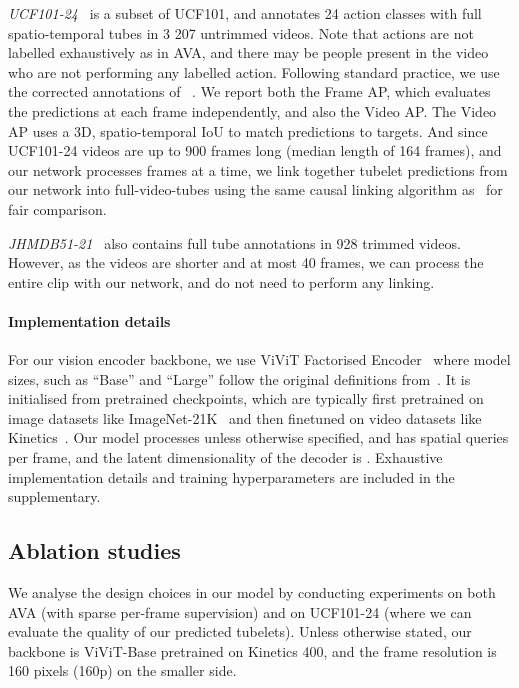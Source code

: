 \documentclass[10pt,twocolumn,letterpaper]{article}
\def \paravspace {-0.7\baselineskip}
\begin{document}
\textit{UCF101-24~\cite{soomro_arxiv_2012}} is a subset of UCF101, and annotates 24 action classes 
with full spatio-temporal tubes in 3 207 untrimmed videos.
Note that actions are not labelled exhaustively as in AVA, and there may be people present in the video who are not performing any labelled action.
Following standard practice, we use the corrected annotations of ~\cite{singh_iccv_2017}.
We report both the Frame AP, which evaluates the predictions at each frame independently, and also the Video AP.
The Video AP uses a 3D, spatio-temporal IoU to match predictions to targets.
And since UCF101-24 videos are up to 900 frames long (median length of 164 frames), and our network processes  frames at a time, we link together tubelet predictions from our network into full-video-tubes using the same causal linking algorithm as~\cite{kalogeiton_iccv_2017, li2020actions} for fair comparison.

\textit{JHMDB51-21~\cite{jhuang2013towards}} also contains full tube annotations in 928 trimmed videos.
However, as the videos are shorter and at most 40 frames, we can process the entire clip with our network, and do not need to perform any linking.

\vspace{\paravspace}
\paragraph{Implementation details}

For our vision encoder backbone, we use ViViT Factorised Encoder~\cite{arnab2021vivit} where model sizes, such as ``Base'' and ``Large'' follow the original definitions from~\cite{devlin_naacl_2019,dosovitskiy_iclr_2021}.
It is initialised from pretrained checkpoints, which are typically first pretrained on image datasets like ImageNet-21K~\cite{deng_cvpr_2009} and then finetuned on video datasets like Kinetics~\cite{kay_arxiv_2017}.
Our model processes  unless otherwise specified, and has  spatial queries per frame, and the latent dimensionality of the decoder is .
Exhaustive implementation details and training hyperparameters are included in the supplementary.






\subsection{Ablation studies}

We analyse the design choices in our model by conducting experiments on both AVA (with sparse per-frame supervision) and on UCF101-24 (where we can evaluate the quality of our predicted tubelets).
Unless otherwise stated, our backbone is ViViT-Base pretrained on Kinetics 400, and the frame resolution is 160 pixels (160p) on the smaller side. 
\end{document}

